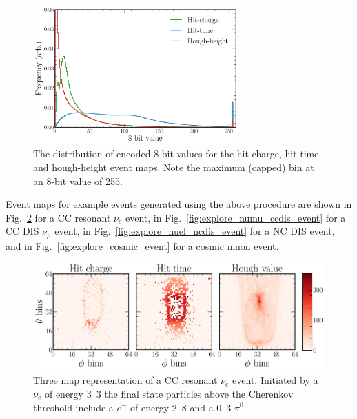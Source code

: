 \begin{figure} %
    \includegraphics[width=0.7\textwidth]{diagrams/7-results/explore_8_bit_range.pdf}
    \caption[Event map encoded 8-bit distributions]
    {The distribution of encoded 8-bit values for the hit-charge, hit-time and hough-height event
        maps. Note the maximum (capped) bin at an 8-bit value of 255.}
    \label{fig:explore_8_bit_range}
\end{figure}

Event maps for example events generated using the above procedure are shown in
Fig.~\ref{fig:explore_nuel_ccres_event} for a CC resonant $\nu_{e}$ event, in
Fig.~\ref{fig:explore_numu_ccdis_event} for a CC DIS $\nu_{\mu}$ event, in
Fig.~\ref{fig:explore_nuel_ncdis_event} for a NC DIS event, and in
Fig.~\ref{fig:explore_cosmic_event} for a cosmic muon event.

\begin{figure} %
    \includegraphics[width=\textwidth]{diagrams/7-results/explore_nuel_ccres_event.pdf}
    \caption[Example of a CC resonant $\nu_{e}$ event]
    {Three map representation of a CC resonant $\nu_{e}$ event. Initiated by a $\nu_{e}$ of energy
        \unit{3.3}{\GeV} the final state particles above the Cherenkov threshold include a $e^{-}$
        of energy \unit{2.8}{\GeV} and a \unit{0.3}{\GeV} $\pi^{0}$.}
    \label{fig:explore_nuel_ccres_event}
\end{figure}

